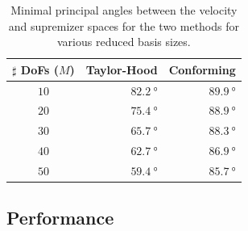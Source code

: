 \documentclass[onecolumn, twoside, a4paper, 11pt]{article}
\begin{document}
\begin{table}
  \begin{center}
    \bgroup{}
    \begin{tabular}{crr}
      $\sharp$ DoFs ($M$) & {\bf Taylor-Hood} & {\bf Conforming} \\
      \hline $10$ & $\SI{82.2}{\degree}$ & $\SI{89.9}{\degree}$ \\
      \hline $20$ & $\SI{75.4}{\degree}$ & $\SI{88.9}{\degree}$ \\
      \hline $30$ & $\SI{65.7}{\degree}$ & $\SI{88.3}{\degree}$ \\
      \hline $40$ & $\SI{62.7}{\degree}$ & $\SI{86.9}{\degree}$ \\
      \hline $50$ & $\SI{59.4}{\degree}$ & $\SI{85.7}{\degree}$ \\
      \hline
    \end{tabular}
    \egroup
  \end{center}
  \caption{
    Minimal principal angles between the velocity and supremizer spaces for the two methods for various
    reduced basis sizes.
  }
  \label{tbl:subspaceangles}
\end{table}

\subsection{Performance}
\end{document}
